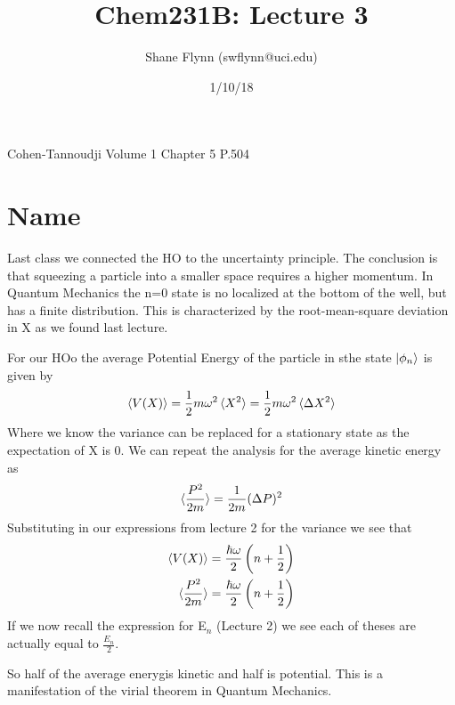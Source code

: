 \documentclass{article}
\title{Chem231B: Lecture 3}
\author{Shane Flynn (swflynn@uci.edu)}
\date{1/10/18}
\newcommand{\be}{\begin{equation}}
\newcommand{\ee}{\end{equation}}
\begin{document}
\maketitle

Cohen-Tannoudji Volume 1 Chapter 5 P.504

\section*{Name}
Last class we connected the HO to the uncertainty principle.
The conclusion is that squeezing a particle into a smaller space requires a higher momentum. 
In Quantum Mechanics the n=0 state is no localized at the bottom of the well, but has a finite distribution. 
This is characterized by the root-mean-square deviation in X as we found last lecture. 

For our HOo the average Potential Energy of the particle in sthe state $\ket{\phi_n}$ is given by
\be
\braket{V(X)} = \frac{1}{2} m\omega^2 \braket{X^2} = \frac{1}{2} m\omega^2 \braket{\Delta X^2}
\ee
Where we know the variance can be replaced for a stationary state as the expectation of X is 0. 
We can repeat the analysis for the average kinetic energy as
\be
\braket{\frac{P^2}{2m}} = \frac{1}{2m}(\Delta P)^2
\ee
Substituting in our expressions from lecture 2 for the variance we see that
\be
\begin{split}
\braket{V(X)} &= \frac{\hbar \omega}{2} \left(n+\frac{1}{2}\right) \\
\braket{\frac{P^2}{2m}} &= \frac{\hbar \omega}{2} \left(n+\frac{1}{2}\right) \\
\end{split}
\ee
If we now recall the expression for E$_n$ (Lecture 2) we see each of theses are actually equal to $\frac{E_n}{2}$.

So half of the average enerygis kinetic and half is potential.
This is a manifestation of the virial theorem in Quantum Mechanics. 
\end{document}
